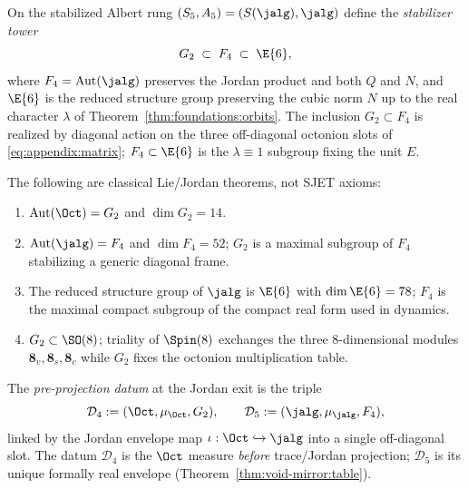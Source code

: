 \begin{definition}\label{def:ladder:tower}
On the stabilized Albert rung $(S_5,A_5)=(S(\jalg),\jalg)$ define the
\emph{stabilizer tower}
\begin{equation}\label{eq:ladder:tower}
  G_2\;\subset\;F_4\;\subset\;\E{6},
\end{equation}
where $F_4=\mathrm{Aut}(\jalg)$ preserves the Jordan product and both $Q$ and
$N$, and $\E{6}$ is the reduced structure group preserving the cubic norm $N$
up to the real character $\lambda$ of Theorem~\ref{thm:foundations:orbits}.
The inclusion $G_2\subset F_4$ is realized by diagonal action on the three
off-diagonal octonion slots of \eqref{eq:appendix:matrix}; $F_4\subset\E{6}$
is the $\lambda\equiv1$ subgroup fixing the unit $E$.
\end{definition}

\begin{lemma}\label{lem:ladder:aut-facts}
The following are classical Lie/Jordan theorems, not SJET axioms:
\begin{enumerate}[label=(\roman*),leftmargin=*]
  \item $\mathrm{Aut}(\Oct)=G_2$ and $\dim G_2=14$.
  \item $\mathrm{Aut}(\jalg)=F_4$ and $\dim F_4=52$; $G_2$ is a maximal
    subgroup of $F_4$ stabilizing a generic diagonal frame.
  \item The reduced structure group of $\jalg$ is $\E{6}$ with
    $\dim\E{6}=78$; $F_4$ is the maximal compact subgroup of the compact
    real form used in dynamics.
  \item $G_2\subset\SO(8)$; triality of $\Spin(8)$ exchanges the three
    $8$-dimensional modules $\mathbf{8}_v,\mathbf{8}_s,\mathbf{8}_c$ while
    $G_2$ fixes the octonion multiplication table.
\end{enumerate}
\end{lemma}

\begin{definition}\label{def:ladder:preproj}
The \emph{pre-projection datum} at the Jordan exit is the triple
\begin{equation}\label{eq:ladder:preproj}
  \mathcal{D}_4:=(\Oct,\mu_{\Oct},G_2),
  \qquad
  \mathcal{D}_5:=(\jalg,\mu_{\jalg},F_4),
\end{equation}
linked by the Jordan envelope map $\iota:\Oct\hookrightarrow\jalg$ into a
single off-diagonal slot. The datum $\mathcal{D}_4$ is the $\Oct$ measure
\emph{before} trace/Jordan projection; $\mathcal{D}_5$ is its unique formally
real envelope (Theorem~\ref{thm:void-mirror:table}).
\end{definition}

